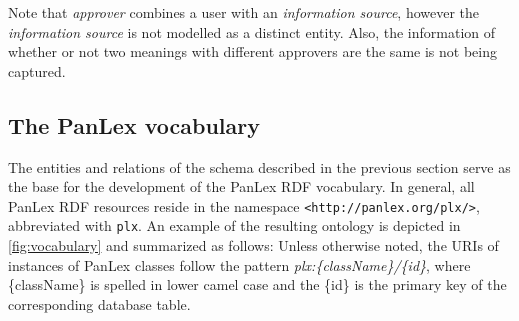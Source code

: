 \documentclass[sw]{iosart2c}
\newcommand*{\origtodo}{}
\let\origtodo\todo
\renewcommand*{\todo}{\origtodo[inline]}
\begin{document}

Note that \emph{approver} combines a user with an \emph{information source},
however the \emph{information source} is not modelled as a distinct entity.
Also, the information of whether or not two meanings with different approvers
are the same is not being captured. 








\subsection{The PanLex vocabulary}
\label{sec:vocabulary}
The entities and relations of the schema described in the previous section
serve as the base for the development of the PanLex RDF vocabulary.
In general, all PanLex RDF resources reside
in the namespace \texttt{\small <http://panlex.org/plx/>}, abbreviated with \texttt{\small plx}.
An example of the resulting ontology is depicted in \autoref{fig:vocabulary} and
summarized as follows:
Unless otherwise noted, the URIs of instances of PanLex classes follow the pattern
\emph{plx:\{className\}/\{id\}}, where \{className\} is spelled in lower camel case
and the \{id\} is the primary key of the corresponding database table.
\end{document}
